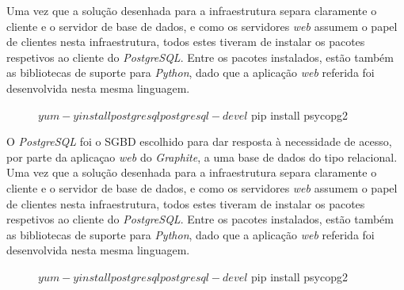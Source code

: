 Uma vez que a solução desenhada para a infraestrutura separa claramente o cliente e o servidor de base de dados, e como os servidores \textit{web} assumem o papel de clientes nesta infraestrutura, todos estes tiveram de instalar os pacotes respetivos ao cliente do \textit{PostgreSQL}.
Entre os pacotes instalados, estão também as bibliotecas de suporte para \textit{Python}, dado que a aplicação \textit{web} referida foi desenvolvida nesta mesma linguagem.

\begin{figure}[!hbt]
\begin{MyVerbatim}
$ yum -y install postgresql postgresql-devel
$ pip install psycopg2
\end{MyVerbatim}
\end{figure}


O \textit{PostgreSQL} foi o SGBD escolhido para dar resposta à necessidade de acesso, por parte da aplicaçao \textit{web} do \textit{Graphite}, a uma base de dados do tipo relacional. \\

Uma vez que a solução desenhada para a infraestrutura separa claramente o cliente e o servidor de base de dados, e como os servidores \textit{web} assumem o papel de clientes nesta infraestrutura, todos estes tiveram de instalar os pacotes respetivos ao cliente do \textit{PostgreSQL}.
Entre os pacotes instalados, estão também as bibliotecas de suporte para \textit{Python}, dado que a aplicação \textit{web} referida foi desenvolvida nesta mesma linguagem.

\begin{figure}[!hbt]
\begin{MyVerbatim}
$ yum -y install postgresql postgresql-devel
$ pip install psycopg2
\end{MyVerbatim}
\end{figure}
